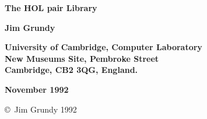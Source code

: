 
\begin{titlepage}

\setcounter{page}{1}                      %


\mbox{}
\vskip20mm
\begin{center}
{\Huge\bf The HOL pair Library}
\end{center}


\vskip15mm
\begin{center}
\large\bf Jim Grundy
\end{center}


\vfill
\begin{center}
\bf
University of Cambridge, Computer Laboratory\\
New Museums Site, Pembroke Street\\
Cambridge, {\small\bf CB}2 3{\small\bf QG}, England.
\end{center}


\vskip5mm
\begin{center}
\bf November 1992
\end{center}

\end{titlepage}

\thispagestyle{empty}
\mbox{}

\vfill
\begin{center}
\copyright\ Jim Grundy 1992
\end{center}
\newpage
